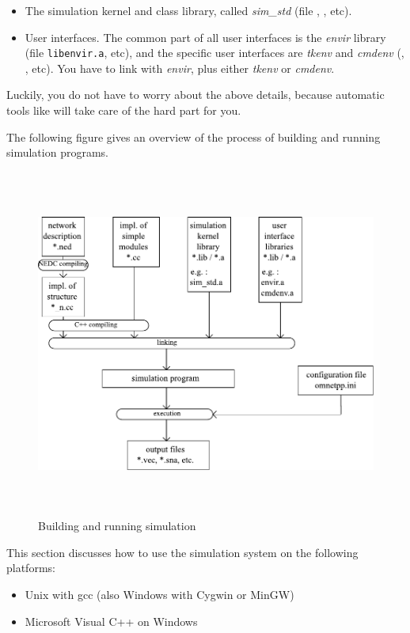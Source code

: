 \begin{itemize}
  \item{The simulation kernel and class library,
    called \textit{sim\_std} (file , , etc).}
  \item{User interfaces. The common part of all user interfaces is
    the \textit{envir} library (file \texttt{libenvir.a}, etc),
    and the specific user interfaces are \textit{tkenv} and \textit{cmdenv}
    (, , etc). You have to link
    with \textit{envir}, plus either \textit{tkenv} or \textit{cmdenv}.}
\end{itemize}

Luckily, you do not have to worry about the above details, because
automatic tools like  will take care of the hard
part for you.

The following figure gives an overview of the process of building
and running simulation programs.

\begin{figure}[htbp]
  \begin{center}
    \includegraphics[width=5.992in, height=4.519in]{figures/usmanFig17}
    \caption{Building and running simulation}
  \end{center}
\end{figure}


This section discusses how to use the simulation system on the
following platforms:
\begin{itemize}
  \item{Unix with gcc (also Windows with Cygwin or MinGW)}
  \item{Microsoft Visual C++ on Windows}
\end{itemize}




